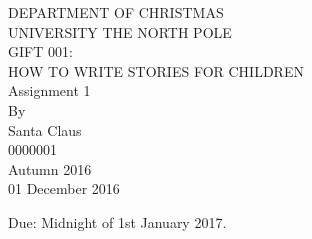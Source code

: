 \documentclass[12pt]{article}
\begin{document}
    \begin{titlepage}
    \vspace*{\fill}
    \begin{center}
        DEPARTMENT OF CHRISTMAS\\[1cm]
        UNIVERSITY THE NORTH POLE\\[1cm]
        GIFT 001:\\[0.2cm]
        HOW TO WRITE STORIES FOR CHILDREN\\[2cm]
        Assignment 1\\[2cm]
        By\\[0.2cm]
        Santa Claus\\[0.2cm]
        0000001\\[2cm]
        Autumn 2016\\[0.2cm]
        01 December 2016
    \end{center}
    \vspace*{\fill}
    \end{titlepage}

    Due: Midnight of 1st January 2017.\\
  
\end{document}
